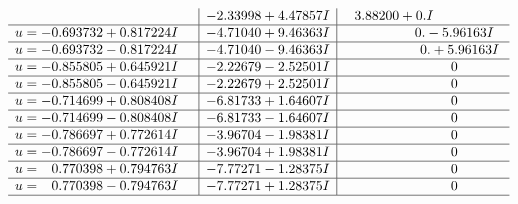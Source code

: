 \documentclass[1p]{elsarticle_modified}
\theoremstyle{definition}
\begin{document}
$$\begin{array}{c|c|c}
 & -2.33998 + 4.47857 I & \phantom{-}3.88200 + 0. I\phantom{ +0.000000I} \\ \hline\begin{aligned}
u &= -0.693732 + 0.817224 I\end{aligned}
 & -4.71040 + 9.46363 I & \phantom{-0.000000 } 0. - 5.96163 I \\ \hline\begin{aligned}
u &= -0.693732 - 0.817224 I\end{aligned}
 & -4.71040 - 9.46363 I & \phantom{-0.000000 -}0. + 5.96163 I \\ \hline\begin{aligned}
u &= -0.855805 + 0.645921 I\end{aligned}
 & -2.22679 - 2.52501 I & \phantom{-0.000000 } 0 \\ \hline\begin{aligned}
u &= -0.855805 - 0.645921 I\end{aligned}
 & -2.22679 + 2.52501 I & \phantom{-0.000000 } 0 \\ \hline\begin{aligned}
u &= -0.714699 + 0.808408 I\end{aligned}
 & -6.81733 + 1.64607 I & \phantom{-0.000000 } 0 \\ \hline\begin{aligned}
u &= -0.714699 - 0.808408 I\end{aligned}
 & -6.81733 - 1.64607 I & \phantom{-0.000000 } 0 \\ \hline\begin{aligned}
u &= -0.786697 + 0.772614 I\end{aligned}
 & -3.96704 - 1.98381 I & \phantom{-0.000000 } 0 \\ \hline\begin{aligned}
u &= -0.786697 - 0.772614 I\end{aligned}
 & -3.96704 + 1.98381 I & \phantom{-0.000000 } 0 \\ \hline\begin{aligned}
u &= \phantom{-}0.770398 + 0.794763 I\end{aligned}
 & -7.77271 - 1.28375 I & \phantom{-0.000000 } 0 \\ \hline\begin{aligned}
u &= \phantom{-}0.770398 - 0.794763 I\end{aligned}
 & -7.77271 + 1.28375 I & \phantom{-0.000000 } 0\\
 \hline 
 \end{array}$$\newpage$$\begin{array}{c|c|c}  

\end{array}$$
\end{document}

